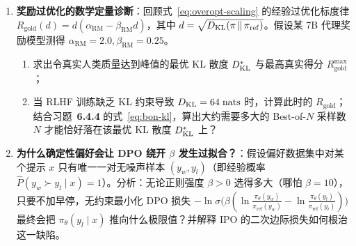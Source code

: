 
\begin{enumerate}
  \item[\textbf{6.4.5}] \textbf{奖励过优化的数学定量诊断}：回顾式~\eqref{eq:overopt-scaling} 的经验过优化标度律 $R_{\mathrm{gold}}(d) = d(\alpha_{\mathrm{RM}} - \beta_{\mathrm{RM}} d)$，其中 $d = \sqrt{D_{\mathrm{KL}}(\pi \,\|\, \pi_{\mathrm{ref}})}$。假设某 7B 代理奖励模型测得 $\alpha_{\mathrm{RM}} = 2.0, \beta_{\mathrm{RM}} = 0.25$。
  \begin{enumerate}
    \item 求出令真实人类质量达到峰值的最优 KL 散度 $D_{\mathrm{KL}}^*$ 与最高真实得分 $R_{\mathrm{gold}}^{\max}$；
    \item 当 RLHF 训练缺乏 KL 约束导致 $D_{\mathrm{KL}} = 64\;\text{nats}$ 时，计算此时的 $R_{\mathrm{gold}}$；结合习题~\textbf{6.4.4} 的式~\eqref{eq:bon-kl}，算出大约需要多大的 Best-of-$N$ 采样数 $N$ 才能恰好落在该最优 KL 散度 $D_{\mathrm{KL}}^*$ 上？
  \end{enumerate}

  \item[\textbf{6.4.6}] \textbf{为什么确定性偏好会让 DPO 绕开 $\beta$ 发生过拟合？}：假设偏好数据集中对某个提示 $x$ 只有唯一一对无噪声样本 $(y_w, y_l)$（即经验概率 $\hat{P}(y_w \succ y_l \mid x) = 1$）。分析：无论正则强度 $\beta > 0$ 选得多大（哪怕 $\beta = 10$），只要不加早停，无约束最小化 DPO 损失 $-\ln \sigma\big(\beta(\ln\frac{\pi_\theta(y_w)}{\pi_{\mathrm{ref}}(y_w)} - \ln\frac{\pi_\theta(y_l)}{\pi_{\mathrm{ref}}(y_l)})\big)$ 最终会把 $\pi_\theta(y_l \mid x)$ 推向什么极限值？并解释 IPO 的二次边际损失如何根治这一缺陷。
\end{enumerate}



